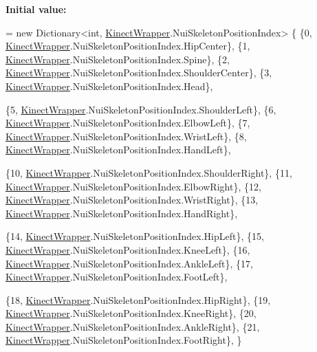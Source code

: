 {\bfseries Initial value\+:}
\begin{DoxyCode}
= \textcolor{keyword}{new} Dictionary<int, \mbox{\hyperlink{class_kinect_wrapper}{KinectWrapper}}.NuiSkeletonPositionIndex>
    \{
        \{0, \mbox{\hyperlink{class_kinect_wrapper}{KinectWrapper}}.NuiSkeletonPositionIndex.HipCenter\},
        \{1, \mbox{\hyperlink{class_kinect_wrapper}{KinectWrapper}}.NuiSkeletonPositionIndex.Spine\},
        \{2, \mbox{\hyperlink{class_kinect_wrapper}{KinectWrapper}}.NuiSkeletonPositionIndex.ShoulderCenter\},
        \{3, \mbox{\hyperlink{class_kinect_wrapper}{KinectWrapper}}.NuiSkeletonPositionIndex.Head\},
        
        \{5, \mbox{\hyperlink{class_kinect_wrapper}{KinectWrapper}}.NuiSkeletonPositionIndex.ShoulderLeft\},
        \{6, \mbox{\hyperlink{class_kinect_wrapper}{KinectWrapper}}.NuiSkeletonPositionIndex.ElbowLeft\},
        \{7, \mbox{\hyperlink{class_kinect_wrapper}{KinectWrapper}}.NuiSkeletonPositionIndex.WristLeft\},
        \{8, \mbox{\hyperlink{class_kinect_wrapper}{KinectWrapper}}.NuiSkeletonPositionIndex.HandLeft\},
        
        \{10, \mbox{\hyperlink{class_kinect_wrapper}{KinectWrapper}}.NuiSkeletonPositionIndex.ShoulderRight\},
        \{11, \mbox{\hyperlink{class_kinect_wrapper}{KinectWrapper}}.NuiSkeletonPositionIndex.ElbowRight\},
        \{12, \mbox{\hyperlink{class_kinect_wrapper}{KinectWrapper}}.NuiSkeletonPositionIndex.WristRight\},
        \{13, \mbox{\hyperlink{class_kinect_wrapper}{KinectWrapper}}.NuiSkeletonPositionIndex.HandRight\},
        
        \{14, \mbox{\hyperlink{class_kinect_wrapper}{KinectWrapper}}.NuiSkeletonPositionIndex.HipLeft\},
        \{15, \mbox{\hyperlink{class_kinect_wrapper}{KinectWrapper}}.NuiSkeletonPositionIndex.KneeLeft\},
        \{16, \mbox{\hyperlink{class_kinect_wrapper}{KinectWrapper}}.NuiSkeletonPositionIndex.AnkleLeft\},
        \{17, \mbox{\hyperlink{class_kinect_wrapper}{KinectWrapper}}.NuiSkeletonPositionIndex.FootLeft\},
        
        \{18, \mbox{\hyperlink{class_kinect_wrapper}{KinectWrapper}}.NuiSkeletonPositionIndex.HipRight\},
        \{19, \mbox{\hyperlink{class_kinect_wrapper}{KinectWrapper}}.NuiSkeletonPositionIndex.KneeRight\},
        \{20, \mbox{\hyperlink{class_kinect_wrapper}{KinectWrapper}}.NuiSkeletonPositionIndex.AnkleRight\},
        \{21, \mbox{\hyperlink{class_kinect_wrapper}{KinectWrapper}}.NuiSkeletonPositionIndex.FootRight\},
    \}
\end{DoxyCode}
\mbox{\label{class_avatar_controller_acf75b54900c0f65fcd27d9a998582ef8}} 
